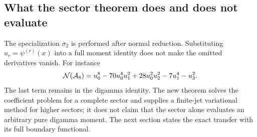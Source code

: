 \subsection{What the sector theorem does and does not evaluate}

The specialization $\sigma_2$ is performed after normal reduction.
Substituting $u_r=\psi^{(r)}(x)$ into a full moment identity does not
make the omitted derivatives vanish. For instance
\[
 \mathcal N(\mathcal A_8)
 =u_0^8-70u_0^4u_1^2+28u_0^2u_2^2-7u_1^4-u_3^2.
\]
The last term remains in the digamma identity. The new theorem solves
the coefficient problem for a complete sector and supplies a
finite-jet variational method for higher sectors; it does not claim
that the sector alone evaluates an arbitrary pure digamma moment.
The next section states the exact transfer with its full boundary
functional.
